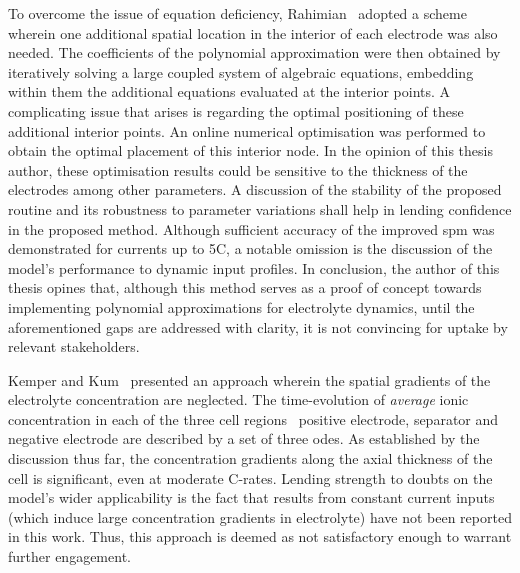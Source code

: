 To overcome the issue of  equation deficiency, Rahimian~\etal{} adopted a scheme
wherein one  additional spatial location in  the interior of each  electrode was
also needed. The coefficients of the polynomial approximation were then obtained
by iteratively solving a large  coupled system of algebraic equations, embedding
within  them  the additional  equations  evaluated  at  the interior  points.  A
complicating issue  that arises  is regarding the  optimal positioning  of these
additional interior  points. An online  numerical optimisation was  performed to
obtain  the optimal  placement of  this interior  node. In  the opinion  of this
thesis author, these optimisation results could be sensitive to the thickness of
the electrodes  among other  parameters. A  discussion of  the stability  of the
proposed  routine and  its  robustness  to parameter  variations  shall help  in
lending confidence in  the proposed method. Although sufficient  accuracy of the
improved \gls{spm} was demonstrated for currents up to 5C, a notable omission is
the  discussion  of  the  model's  performance to  dynamic  input  profiles.  In
conclusion, the author  of this thesis opines that, although  this method serves
as  a  proof  of  concept towards  implementing  polynomial  approximations  for
electrolyte dynamics, until the aforementioned  gaps are addressed with clarity,
it is not convincing for uptake by relevant stakeholders.

Kemper  and  Kum~\cite{Kemper2013} presented  an  approach  wherein the  spatial
gradients  of the  electrolyte concentration  are neglected.  The time-evolution
of  \emph{average}  ionic  concentration  in  each of  the  three  cell  regions
\viz~positive electrode,  separator and  negative electrode  are described  by a
set  of three  \glspl{ode}.  As  established by  the  discussion  thus far,  the
concentration gradients  along the axial  thickness of the cell  is significant,
even at  moderate {C-rates}.  Lending strength  to doubts  on the  model's wider
applicability  is the  fact that  results  from constant  current inputs  (which
induce large concentration  gradients in electrolyte) have not  been reported in
this work. Thus,  this approach is deemed as not  satisfactory enough to warrant
further engagement.

